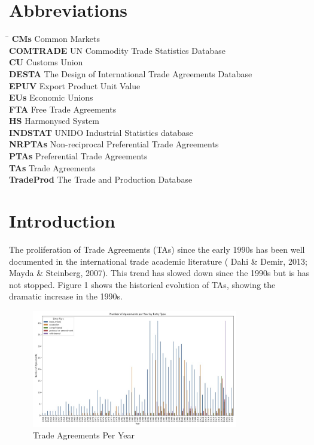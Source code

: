 \documentclass[12pt]{article}%
\begin{document}
\section*{Abbreviations}%
\label{sec:Abbreviations}%
\begin{tabbing}%
\hspace{3cm} \= \kill%
\textbf{CMs} \> Common Markets \\%
\textbf{COMTRADE} \> UN Commodity Trade Statistics Database \\%
\textbf{CU} \> Customs Union \\%
\textbf{DESTA} \> The Design of International Trade Agreements Database \\%
\textbf{EPUV} \> Export Product Unit Value \\%
\textbf{EUs} \> Economic Unions \\%
\textbf{FTA} \> Free Trade Agreements \\%
\textbf{HS} \> Harmonysed System \\%
\textbf{INDSTAT } \> UNIDO Industrial Statistics database \\%
\textbf{NRPTAs} \> Non-reciprocal Preferential Trade Agreements \\%
\textbf{PTAs} \> Preferential Trade Agreements \\%
\textbf{TAs} \> Trade Agreements \\%
\textbf{TradeProd} \> The Trade and Production Database \\%
\end{tabbing}

%
\newpage%
\listoffigures%
\newpage%
\listoftables%
\newpage%
%
\pagestyle{mainmatter}%
\section{Introduction}%
\label{sec:Introduction}%
The proliferation of Trade Agreements (TAs) since the early 1990s has
been well documented in the international trade academic literature
(\cite{dahi_preferential_2013} Dahi \& Demir, 2013; \cite{mayda_south-south_2007} Mayda \& Steinberg, 2007). This trend has slowed
down since the 1990s but is has not stopped. Figure 1 shows the historical
evolution of TAs, showing the dramatic increase in the 1990s.%


\begin{figure}[h!]%
\centering%
\includegraphics[width=0.8\textwidth]{figures/all_entries_agreements_per_year.jpg}%
\caption{Trade Agreements Per Year}%
\end{figure}
\end{document}
